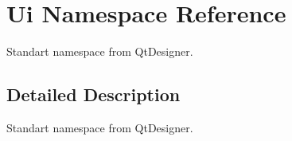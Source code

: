 \hypertarget{namespace_ui}{\section{\-Ui \-Namespace \-Reference}
\label{namespace_ui}
}


\-Standart namespace from \-Qt\-Designer.  




\subsection{\-Detailed \-Description}
\-Standart namespace from \-Qt\-Designer. 